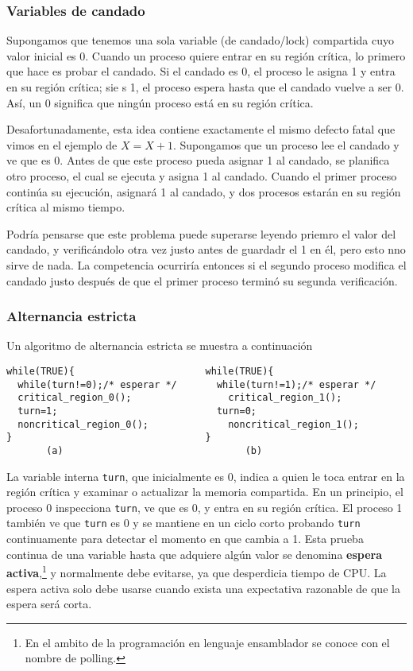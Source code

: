 \documentclass{article}
\begin{document}
\subsubsection*{Variables de candado}
Supongamos que tenemos una sola variable (de candado/lock) compartida 
cuyo valor inicial es 0. Cuando un proceso quiere entrar en su regi\'on 
cr\'itica, lo primero que hace es probar el candado. Si el candado es 0, 
el proceso le asigna 1 y entra en su regi\'on cr\'itica; sie s 1, el 
proceso espera hasta que el candado vuelve a ser 0. As\'i, un 0 significa 
que ning\'un proceso est\'a en su regi\'on cr\'itica.

Desafortunadamente, esta idea contiene exactamente el mismo defecto 
fatal que vimos en el ejemplo de $X=X+1$. Supongamos que un proceso lee 
el candado y ve que es 0. Antes de que este proceso pueda asignar 1 al 
candado, se planifica otro proceso, el cual se ejecuta y asigna 1 al 
candado. Cuando el primer proceso contin\'ua su ejecuci\'on, asignar\'a 
1 al candado, y dos procesos estar\'an en su regi\'on cr\'itica al mismo 
tiempo.

Podr\'ia pensarse que este problema puede superarse leyendo priemro el 
valor del candado, y verific\'andolo otra vez justo antes de guardadr el 
1 en \'el, pero esto nno sirve de nada. La competencia ocurrir\'ia entonces 
si el segundo proceso modif\/ica el candado justo despu\'es de que el primer 
proceso termin\'o su segunda verif\/icaci\'on.

\subsubsection*{Alternancia estricta}
Un algoritmo de alternancia estricta se muestra a continuaci\'on
\begin{verbatim}
while(TRUE){                       while(TRUE){
  while(turn!=0);/* esperar */       while(turn!=1);/* esperar */
  critical_region_0();                 critical_region_1();
  turn=1;                            turn=0;
  noncritical_region_0();              noncritical_region_1();
}                                  }
       (a)                                (b)
\end{verbatim}
La variable interna {\tt turn}, que inicialmente es 0, indica a quien le 
toca entrar en la regi\'on cr\'itica y examinar o actualizar la memoria 
compartida. En un principio, el proceso 0 inspecciona {\tt turn}, ve que es 
0, y entra en su regi\'on cr\'itica. El proceso 1 tambi\'en ve que {\tt turn} 
es 0 y se mantiene en un ciclo corto probando {\tt turn} continuamente para 
detectar el momento en que cambia a 1. Esta prueba continua de una variable 
hasta que adquiere alg\'un valor se denomina {\bf espera activa},\footnote{En 
el ambito de la programaci\'on en lenguaje ensamblador se conoce con el 
nombre de polling.} y normalmente debe evitarse, ya que desperdicia tiempo 
de CPU. La espera activa solo debe usarse cuando exista una expectativa 
razonable de que la espera ser\'a corta. 
\end{document}
